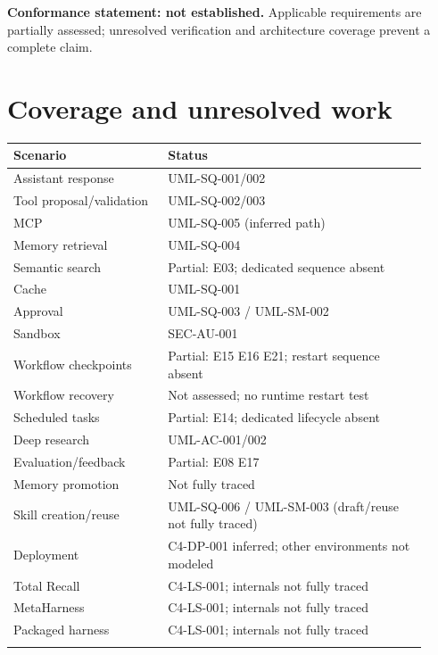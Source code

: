 \documentclass[10pt,letterpaper]{article}
\begin{document}
\textbf{Conformance statement: not established.} Applicable requirements are partially assessed; unresolved verification and architecture coverage prevent a complete claim.
\appendix
\section{Coverage and unresolved work}
\begin{longtable}{@{}>{\raggedright\arraybackslash}p{0.34\linewidth}>{\raggedright\arraybackslash}p{0.58\linewidth}@{}}
\toprule
Scenario & Status\\\midrule\endhead
Assistant response & UML-SQ-001/002\\\addlinespace
Tool proposal/validation & UML-SQ-002/003\\\addlinespace
MCP & UML-SQ-005 (inferred path)\\\addlinespace
Memory retrieval & UML-SQ-004\\\addlinespace
Semantic search & Partial: E03; dedicated sequence absent\\\addlinespace
Cache & UML-SQ-001\\\addlinespace
Approval & UML-SQ-003 / UML-SM-002\\\addlinespace
Sandbox & SEC-AU-001\\\addlinespace
Workflow checkpoints & Partial: E15 E16 E21; restart sequence absent\\\addlinespace
Workflow recovery & Not assessed; no runtime restart test\\\addlinespace
Scheduled tasks & Partial: E14; dedicated lifecycle absent\\\addlinespace
Deep research & UML-AC-001/002\\\addlinespace
Evaluation/feedback & Partial: E08 E17\\\addlinespace
Memory promotion & Not fully traced\\\addlinespace
Skill creation/reuse & UML-SQ-006 / UML-SM-003 (draft/reuse not fully traced)\\\addlinespace
Deployment & C4-DP-001 inferred; other environments not modeled\\\addlinespace
Total Recall & C4-LS-001; internals not fully traced\\\addlinespace
MetaHarness & C4-LS-001; internals not fully traced\\\addlinespace
Packaged harness & C4-LS-001; internals not fully traced\\\addlinespace
\bottomrule\end{longtable}
\end{document}
